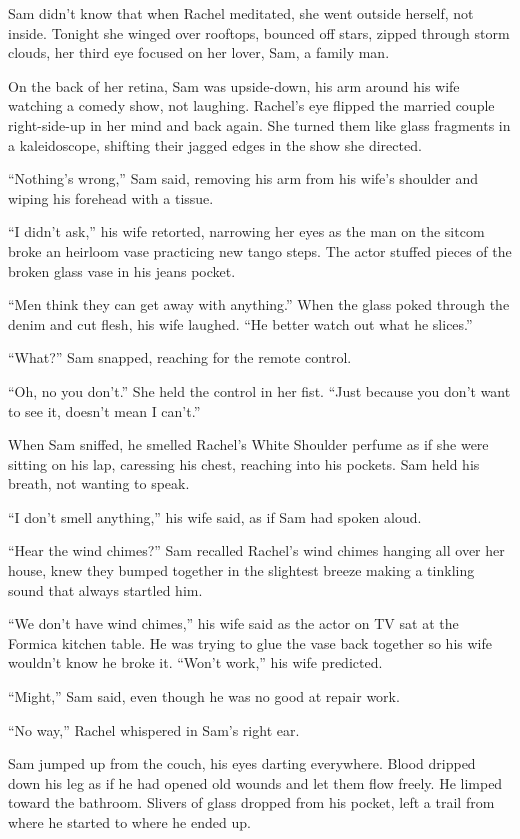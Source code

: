 \documentclass[
]{article}
\begin{document}
Sam didn't know that when Rachel meditated, she went outside herself,
not inside. Tonight she winged over rooftops, bounced off stars, zipped
through storm clouds, her third eye focused on her lover, Sam, a family
man.

On the back of her retina, Sam was upside-down, his arm around his wife
watching a comedy show, not laughing. Rachel's eye flipped the married
couple right-side-up in her mind and back again. She turned them like
glass fragments in a kaleidoscope, shifting their jagged edges in the
show she directed.

``Nothing's wrong,'' Sam said, removing his arm from his wife's shoulder
and wiping his fore­head with a tissue.

``I didn't ask,'' his wife retorted, narrowing her eyes as the man on
the sitcom broke an heir­loom vase practicing new tango steps. The actor
stuffed pieces of the broken glass vase in his jeans pocket.

``Men think they can get away with anything.'' When the glass poked
through the denim and cut flesh, his wife laughed. ``He better watch out
what he slices.''

``What?'' Sam snapped, reaching for the remote control.

``Oh, no you don't.'' She held the control in her fist. ``Just because
you don't want to see it, doesn't mean I can't.''

When Sam sniffed, he smelled Rachel's White Shoulder perfume as if she
were sitting on his lap, caressing his chest, reaching into his pockets.
Sam held his breath, not wanting to speak.

``I don't smell anything,'' his wife said, as if Sam had spoken aloud.

``Hear the wind chimes?'' Sam recalled Rachel's wind chimes hanging all
over her house, knew they bumped together in the slightest breeze making
a tinkling sound that always startled him.

``We don't have wind chimes,'' his wife said as the actor on TV sat at
the Formica kitchen table. He was trying to glue the vase back together
so his wife wouldn't know he broke it. ``Won't work,'' his wife
predicted.

``Might,'' Sam said, even though he was no good at repair work.

``No way,'' Rachel whispered in Sam's right ear.

Sam jumped up from the couch, his eyes darting everywhere. Blood dripped
down his leg as if he had opened old wounds and let them flow freely. He
limped toward the bathroom. Slivers of glass dropped from his pocket,
left a trail from where he started to where he ended up.
\end{document}
